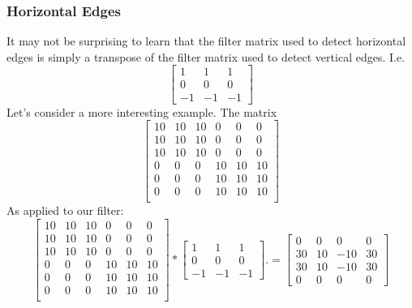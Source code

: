 \documentclass[12pt]{article}
\begin{document}
\subsubsection{Horizontal Edges} It may not be surprising to learn that the filter
matrix used to detect horizontal edges is simply a transpose of the filter matrix
used to detect vertical edges. I.e.
\begin{equation*} \begin{bmatrix}   1 & 1 & 1 \\ 0 & 0 & 0 \\ -1 & -1 & -1 \end{bmatrix}   \end{equation*}
Let's consider a more interesting example. The matrix
\begin{equation}   \begin{bmatrix}     10 & 10 & 10 & 0 & 0 & 0 \\
    10 & 10 & 10 & 0 & 0 & 0 \\
    10 & 10 & 10 & 0 & 0 & 0 \\
    0 & 0 & 0 & 10 & 10 & 10 \\
    0 & 0 & 0 & 10 & 10 & 10 \\
    0 & 0 & 0 & 10 & 10 & 10 \\   \end{bmatrix} \end{equation}
As applied to our filter:
\begin{equation*}   \begin{bmatrix}     
    10 & 10 & 10 & 0 & 0 & 0 \\
    10 & 10 & 10 & 0 & 0 & 0 \\
    10 & 10 & 10 & 0 & 0 & 0 \\
    0 & 0 & 0 & 10 & 10 & 10 \\
    0 & 0 & 0 & 10 & 10 & 10 \\
    0 & 0 & 0 & 10 & 10 & 10 \\       \end{bmatrix}
  *
  \begin{bmatrix}   1 & 1 & 1 \\ 0 & 0 & 0 \\ -1 & -1 & -1 \end{bmatrix}.
  =
  \begin{bmatrix}     0 & 0 & 0 & 0 \\
    30 & 10 & -10 & 30 \\
    30 & 10 & -10 & 30 \\
    0 & 0 & 0 & 0   \end{bmatrix} \end{equation*}
\end{document}
